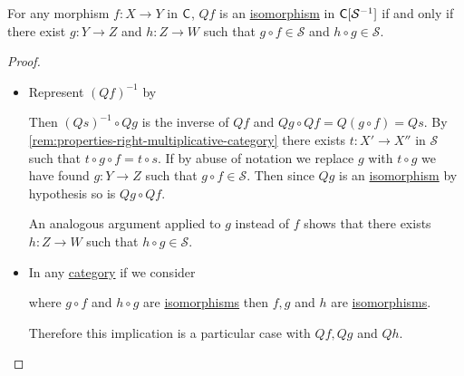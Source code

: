 \documentclass[../../main]{subfiles}
\begin{document}
\begin{proposition}\label{prop:saturated-system-characterization}
  For any morphism \(f: X \to Y\) in \(\mathsf{C}\), \(Qf\) is an \hyperref[def:categorical-isomorphism]{isomorphism} in \(\mathsf{C}[\mathcal{S}^{-1}]\) if and only if there exist \(g: Y \to Z\) and \(h: Z \to W\) such that \(g \circ f \in \mathcal{S}\) and \(h \circ g \in \mathcal{S}\).
\end{proposition}
\begin{proof}~
  \begin{itemize}
    \item[\(\implies\)] Represent \((Qf)^{-1}\) by
          \begin{center}
          \end{center}
          Then \((Qs)^{-1} \circ Qg\) is the inverse of \(Qf\) and \(Qg \circ Qf = Q(g \circ f) = Qs\).
          By \autoref{rem:properties-right-multiplicative-category} there exists \(t: X' \to X''\) in \(\mathcal{S}\) such that \(t \circ g \circ f = t \circ s\).
          If by abuse of notation we replace \(g\) with \(t \circ g\) we have found \(g: Y \to Z\) such that \(g \circ f \in \mathcal{S}\).
          Then since \(Qg\) is an \hyperref[def:categorical-isomorphism]{isomorphism} by hypothesis so is \(Qg \circ Qf\).

          An analogous argument applied to \(g\) instead of \(f\) shows that there exists \(h: Z \to W\) such that \(h \circ g \in \mathcal{S}\).

    \item[\(\impliedby\)] In any \hyperref[def:category]{category} if we consider
          \begin{center}
          \end{center}
          where \(g \circ f\) and \(h \circ g\) are \hyperref[def:categorical-isomorphism]{isomorphisms} then \(f, g\) and \(h\) are \hyperref[def:categorical-isomorphism]{isomorphisms}.

          Therefore this implication is a particular case with \(Qf, Qg\) and \(Qh\).
  \end{itemize}
\end{proof}
\end{document}
